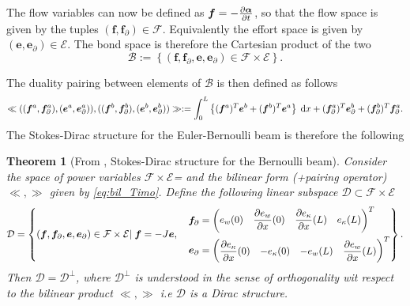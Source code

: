 \documentclass[preprint,12pt]{elsarticle}
\newtheorem{theorem}{Theorem}
\begin{document}
The flow variables can now be defined as $\bm{f} = - \diffp{\bm{\alpha}}{t}$, so that the flow space is given by the tuples
$(\bm{f},\bm{f}_{\partial}) \in \mathcal{F}$. Equivalently the effort space is given by $(\bm{e},\bm{e}_{\partial}) \in \mathcal{E}$. The bond space is therefore the Cartesian product of the two
\begin{equation}
\mathcal{B} := \left\{(\bm{f},\bm{f}_{\partial},\bm{e},\bm{e}_{\partial}) \in \mathcal{F} \times \mathcal{E} \right\}.
\end{equation}

The duality pairing between elements of $\mathcal{B}$ is then defined as follows
\begin{equation}
\label{eq:bil_Timo}
\ll ((\bm{f}^a,\bm{f}_{\partial}^a), (\bm{e}^a,\bm{e}_{\partial}^a)), ((\bm{f}^b,\bm{f}_{\partial}^b), (\bm{e}^b,\bm{e}_{\partial}^b)) \gg := \int_{0}^{L}\left\{ (\bm{f}^{a})^T \bm{e}^b + (\bm{f}^{b})^T \bm{e}^a \right\} \d{x} + (\bm{f}_{\partial}^{a})^T \bm{e}_{\partial}^b + (\bm{f}_{\partial}^{b}) ^T \bm{f}_{\partial}^a.
\end{equation}
The Stokes-Dirac structure for the Euler-Bernoulli beam is therefore the following
\begin{theorem}[From \cite{LeGorrec2005}, Stokes-Dirac structure for the Bernoulli beam]
	Consider the space of power variables $\mathcal{F} \times \mathcal{E}$= and the bilinear form (+pairing operator) $\ll , \gg$ given by \eqref{eq:bil_Timo}. Define the following linear subspace $\mathcal{D} \subset \mathcal{F} \times \mathcal{E}$
	\begin{equation}
	\mathcal{D} =  \left\{(\bm{f},\bm{f}_{\partial},\bm{e},\bm{e}_{\partial}) \in \mathcal{F} \times \mathcal{E} | \; \bm{f} = -J\bm{e},  \quad
	\begin{aligned}
	\bm{f}_{\partial} &= 
	\begin{pmatrix} 
	e_w(0) \vspace{3pt} & \displaystyle  \diffp{e_{w}}{x}(0) & \displaystyle \diffp{e_{\kappa}}{x}(L) &	e_{\kappa}(L) \\
	\end{pmatrix}^T \\
	\bm{e}_{\partial} &= 
	\begin{pmatrix}
	\displaystyle \diffp{e_{\kappa}}{x}(0) & 	-e_{\kappa}(0) & -e_w(L) & \displaystyle \diffp{e_{w}}{x}(L)\\
	\end{pmatrix}^T
	\end{aligned} \right\}.
	\end{equation}
	Then $\mathcal{D} = \mathcal{D}^{\perp}$, where $\mathcal{D}^{\perp}$ is understood in the sense of orthogonality wit respect to the bilinear product $\ll , \gg$  i.e $\mathcal{D}$ is a Dirac structure. 
\end{theorem}
\end{document}
